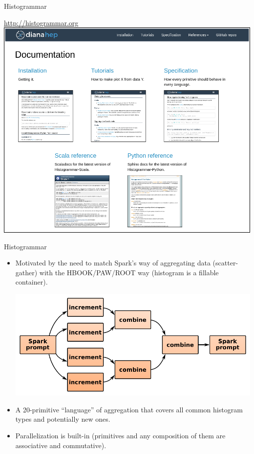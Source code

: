 \documentclass{beamer}
\begin{document}
\begin{frame}{Histogrammar}
\vspace{0.25 cm}

\vspace{-2.7 cm}
\textcolor{blue}{\small \url{http://histogrammar.org}} \hfill \includegraphics[width=0.5\linewidth]{histogrammar2.png}
\end{frame}

\begin{frame}{Histogrammar}
\vspace{0.5 cm}
\begin{itemize}\setlength{\itemsep}{0.25 cm}
\item Motivated by the need to match Spark's way of aggregating data (scatter-gather) with the HBOOK/PAW/ROOT way (histogram is a fillable container).

\begin{center}
\includegraphics[width=0.7\linewidth]{aggregate.pdf}
\end{center}

\item A 20-primitive ``language'' of aggregation that covers all common histogram types and potentially new ones.

\item Parallelization is built-in (primitives and any composition of them are associative and commutative).
\end{itemize}
\end{frame}
\end{document}
